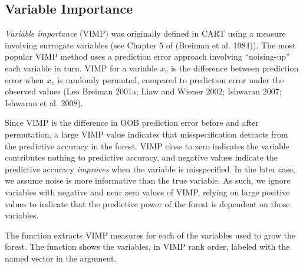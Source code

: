 \documentclass[article]{jss}
\begin{document}
\subsection{Variable Importance}\label{variable-importance}

\emph{Variable importance} (VIMP) was originally defined in CART using a
measure involving surrogate variables (see Chapter 5 of (Breiman et al.
1984)). The most popular VIMP method uses a prediction error approach
involving ``noising-up'' each variable in turn. VIMP for a variable
\(x_v\) is the difference between prediction error when \(x_v\) is
randomly permuted, compared to prediction error under the observed
values (Leo Breiman 2001a; Liaw and Wiener 2002; Ishwaran 2007; Ishwaran
et al. 2008).

Since VIMP is the difference in OOB prediction error before and after
permutation, a large VIMP value indicates that misspecification detracts
from the predictive accuracy in the forest. VIMP close to zero indicates
the variable contributes nothing to predictive accuracy, and negative
values indicate the predictive accuracy \emph{improves} when the
variable is misspecified. In the later case, we assume noise is more
informative than the true variable. As such, we ignore variables with
negative and near zero values of VIMP, relying on large positive values
to indicate that the predictive power of the forest is dependent on
those variables.

The  function extracts VIMP measures for each of the
variables used to grow the forest. The  function
shows the variables, in VIMP rank order, labeled with the named vector
in the  argument.
\end{document}
